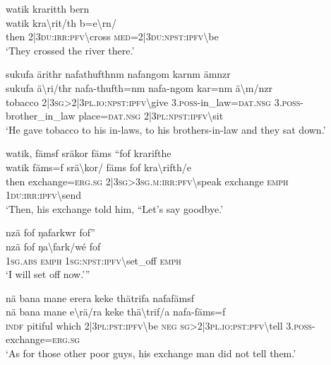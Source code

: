 \ea\label{ex:5:a1515}
watik kraritth bern\\
\gll watik	kra{\textbackslash}rit/th	b=e{\textbackslash}rn/\\
     then	2|3\textsc{du}:\textsc{irr}:\textsc{pfv}{\textbackslash}cross	\textsc{med}=2|3\textsc{du}:\textsc{npst}:\textsc{ipfv}{\textbackslash}be\\
\glt `They crossed the river there.'
\z

\ea\label{ex:5:a1516}
sukufa ärithr nafathufthnm nafangom karnm ämnzr\\
\gll sukufa	ä{\textbackslash}ri/thr	nafa-thufth=nm	nafa-ngom	kar=nm	ä{\textbackslash}m/nzr\\
     tobacco	2|3\textsc{sg}>2|3\textsc{pl}.\textsc{io}:\textsc{npst}:\textsc{ipfv}{\textbackslash}give	3.\textsc{poss}-in\_law=\textsc{dat}.\textsc{nsg}	3.\textsc{poss}-brother\_in\_law	place=\textsc{dat}.\textsc{nsg}	2|3\textsc{pl}:\textsc{npst}:\textsc{ipfv}{\textbackslash}sit\\
\glt `He gave tobacco to his in-laws, to his brothers-in-law and they sat down.'
\z

\ea\label{ex:5:a1520}
watik, fämsf sräkor fäms ``fof krarifthe\\
\gll watik	fäms=f	srä{\textbackslash}kor/	fäms	fof	kra{\textbackslash}rifth/e\\
     then	exchange=\textsc{erg}.\textsc{sg}	2|3\textsc{sg}>3\textsc{sg}.\textsc{m}:\textsc{irr}:\textsc{pfv}{\textbackslash}speak	exchange	\textsc{emph}	1\textsc{du}:\textsc{irr}:\textsc{ipfv}{\textbackslash}send\\
\glt `Then, his exchange told him, ``Let's say goodbye.'
\z

\ea\label{ex:5:a1521}
nzä fof ŋafarkwr fof''\\
\gll nzä	fof	ŋa{\textbackslash}fark/wé	fof\\
     1\textsc{sg}.\textsc{abs}	\textsc{emph}	1\textsc{sg}:\textsc{npst}:\textsc{ipfv}{\textbackslash}set\_off	\textsc{emph}\\
\glt `I will set off now.'''
\z

\ea\label{ex:5:a1522}
nä bana mane erera keke thätrifa nafafämsf\\
\gll nä	bana	mane	e{\textbackslash}rä/ra	keke	thä{\textbackslash}trif/a	nafa-fäms=f\\
     \textsc{indf}	pitiful	which	2|3\textsc{pl}:\textsc{pst}:\textsc{ipfv}{\textbackslash}be	\textsc{neg}	\textsc{sg}>2|3\textsc{pl}.\textsc{io}:\textsc{pst}:\textsc{pfv}{\textbackslash}tell	3.\textsc{poss}-exchange=\textsc{erg}.\textsc{sg}\\
\glt `As for those other poor guys, his exchange man did not tell them.'
\z

